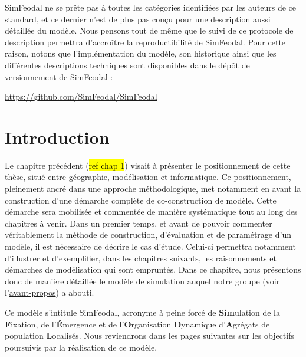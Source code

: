 \begin{mdframed}[backgroundcolor=black!5,footnoteinside=false]
SimFeodal ne se prête pas à toutes les catégories identifiées par les auteurs de ce standard, et ce dernier n'est de plus pas conçu pour une description aussi détaillée du modèle.
Nous pensons tout de même que le suivi de ce protocole de description permettra d'accroître la reproductibilité de SimFeodal.
Pour cette raison, notons que l'implémentation du modèle, son historique ainsi que les différentes descriptions techniques sont disponibles dans le dépôt de versionnement de SimFeodal :
\begin{center}
	\href{https://github.com/SimFeodal/SimFeodal}{https://github.com/SimFeodal/SimFeodal}
\end{center}

\end{mdframed}

\clearpage

\clearpage


\section*{Introduction}
\label{sec:chap2-intro}

Le chapitre précédent (\hl{ref chap 1}) visait à présenter le positionnement de cette thèse, situé entre géographie, modélisation et informatique.
Ce positionnement, pleinement ancré dans une approche méthodologique, met notamment en avant la construction d'une démarche complète de co-construction de modèle.
Cette démarche sera mobilisée et commentée de manière systématique tout au long des chapitres à venir.
Dans un premier temps, et avant de pouvoir commenter véritablement la méthode de construction, d'évaluation et de paramétrage d'un modèle, il est nécessaire de décrire le cas d'étude.
Celui-ci permettra notamment d'illustrer et d'exemplifier, dans les chapitres suivants, les raisonnements et démarches de modélisation qui sont empruntés.
Dans ce chapitre, nous présentons donc de manière détaillée le modèle de simulation auquel notre groupe (voir l'\hyperlink{avant-propos}{avant-propos}) a abouti.

Ce modèle s'intitule SimFeodal, acronyme à peine forcé de \og \textbf{Sim}ulation de la \textbf{F}ixation, de l'\textbf{É}mergence et de l'\textbf{O}rganisation \textbf{D}ynamique d'\textbf{A}grégats de population \textbf{L}ocalisés\fg{}.
Nous reviendrons dans les pages suivantes sur les objectifs poursuivis par la réalisation de ce modèle.

